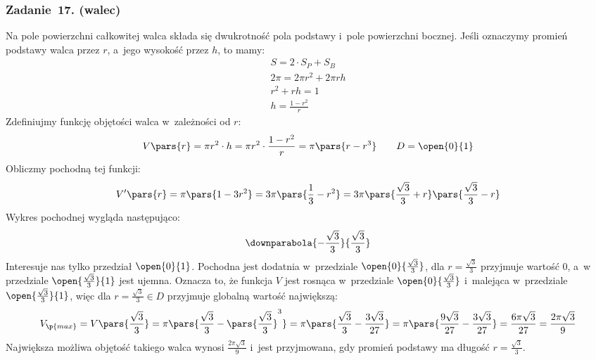\subsubsection*{Zadanie~17. (walec)}
Na pole powierzchni całkowitej walca składa się dwukrotność pola podstawy i~pole powierzchni bocznej. Jeśli oznaczymy promień podstawy walca przez \(r\), a~jego wysokość przez \(h\), to mamy:
\begin{gather*}
    S = 2 \cdot S_P + S_B\\
    2\pi = 2\pi r^2 + 2\pi r h\\
    r^2 + rh = 1\\
    h = \frac{1 - r^2}{r}
\end{gather*}
Zdefiniujmy funkcję objętości walca w~zależności od \(r\):
\begin{equation*}
    V\pars{r}
        = \pi r^2 \cdot h
        = \pi r^2 \cdot \frac{1 - r^2}{r}
        = \pi\pars{r - r^3} \qquad D = \open{0}{1}
\end{equation*}
Obliczmy pochodną tej funkcji:
\begin{equation*}
    V'\pars{r}
        = \pi\pars{1 - 3r^2}
        = 3\pi\pars{\frac{1}{3} - r^2}
        = 3\pi\pars{\frac{\sqrt{3}}{3} + r}\pars{\frac{\sqrt{3}}{3} - r}
\end{equation*}
Wykres pochodnej wygląda następująco:
\begin{equation*}
    \downparabola{-\frac{\sqrt{3}}{3}}{\frac{\sqrt{3}}{3}}
\end{equation*}
Interesuje nas tylko przedział \(\open{0}{1}\). Pochodna jest dodatnia w~przedziale \(\open{0}{\frac{\sqrt{3}}{3}}\), dla \(r = \frac{\sqrt{3}}{3}\) przyjmuje wartość \(0\), a~w przedziale \(\open{\frac{\sqrt{3}}{3}}{1}\) jest ujemna. Oznacza to, że funkcja \(V\) jest rosnąca w~przedziale \(\open{0}{\frac{\sqrt{3}}{3}}\) i~malejąca w~przedziale \(\open{\frac{\sqrt{3}}{3}}{1}\), więc dla \(r = \frac{\sqrt{3}}{3} \in D\) przyjmuje globalną wartość największą:
\begin{equation*}
    V_\p{max}
        = V\pars{\frac{\sqrt{3}}{3}}
        = \pi\pars{\frac{\sqrt{3}}{3} - \pars{\frac{\sqrt{3}}{3}}^3}
        = \pi\pars{\frac{\sqrt{3}}{3} - \frac{3\sqrt{3}}{27}}
        = \pi\pars{\frac{9\sqrt{3}}{27} - \frac{3\sqrt{3}}{27}}
        = \frac{6\pi\sqrt{3}}{27}
        = \frac{2\pi\sqrt{3}}{9}
\end{equation*}
Największa możliwa objętość takiego walca wynosi \(\frac{2\pi\sqrt{3}}{9}\) i~jest przyjmowana, gdy promień podstawy ma długość \(r = \frac{\sqrt{3}}{3}\).
